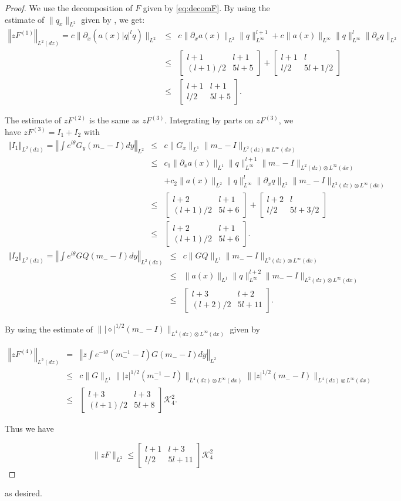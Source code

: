 \documentclass{amsart}
\theoremstyle{plain}
\theoremstyle{remark}
\numberwithin{equation}{section}
\newcommand{\norm}[2]{\left\Vert #1\right\Vert_{#2}}
\newcommand{\Twomat}[4]
{
\left[
	\begin{array}{cc}
		{#1}	&	{#2}	\\[10pt]
		{#3}	&	{#4}
		\end{array}
\right]
}
\begin{document}
\begin{proof}
We use the decomposition of $F$ given by \eqref{eq:decomF}.
By using the estimate of $\|q_x\|_{L^2}$ given by \cite[Lemma 5.24]{DZ-2}, we get:
\begin{eqnarray*}
    \norm{z F^{(1)}}{L^2(dz)} =c \|\partial_x (a(x) |q|^l q)\|_{L^2} &\leq& c \|\partial_x a(x)\|_{L^2} \|q\|_{L^\infty}^{l+1} + c\|a(x)\|_{L^\infty} \|q\|_{L^\infty}^l \|\partial_x q\|_{L^2}\\
    &\leq& \Twomat{l+1}{l+1}{(l+1)/2}{5l+5}+\Twomat{l+1}{l}{l/2}{5l+1/2}\\
    &\leq& \Twomat{l+1}{l+1}{l/2}{5l+5}.
\end{eqnarray*}

The estimate of $zF^{(2)}$ is the same as $zF^{(3)}$. Integrating by parts on $zF^{(3)}$, we have $zF^{(3)}=I_1+I_2$ with
\begin{eqnarray*}
    \norm{I_{1}}{L^2(dz)} = \left \Vert \int e^{i \theta}G_y(m_--I)dy \right \Vert_{L^2} &\leq&c\|G_x\|_{L^1} \|m_--I\|_{L^2(dz) \otimes L^\infty(dx)} \\
    & \leq &c_1\|\partial_x a(x)\|_{L^1} \|q\|_{L^\infty}^{l+1}\|m_--I\|_{L^2(dz) \otimes L^\infty(dx)}\\
    &&+c_2\|a(x)\|_{L^2} \|q\|_{L^\infty}^l \|\partial_x q\|_{L^2}\|m_--I\|_{L^2(dz) \otimes L^\infty(dx)}\\
    &\leq&\Twomat{l+2}{l+1}{(l+1)/2}{5l+6}+\Twomat{l+2}{l}{l/2}{5l+3/2}\\
    &\leq&\Twomat{l+2}{l+1}{(l+1)/2}{5l+6}.
\end{eqnarray*}
\begin{eqnarray*}
   \norm{I_{2}}{L^2(dz)} = \left \Vert \int e^{i \theta}GQ(m_--I)dy \right \Vert_{L^2(dz)} &\leq&c\|GQ\|_{L^1} \|m_--I\|_{L^2(dz) \otimes L^\infty(dx)} \\
    & \leq & \|a(x)\|_{L^1} \|q\|_{L^\infty}^{l+2}\|m_--I\|_{L^2(dz) \otimes L^\infty(dx)}\\
  &  \leq & \Twomat{l+3}{l+2}{(l+2)/2}{5l+11}.
\end{eqnarray*}

By using the estimate of $\||\diamond|^{1/2}(m_--I)\|_{L^4(dz) \otimes L^\infty(dx)}$ given by \cite[Lemma 5.6]{DZ-2}

\begin{eqnarray*}
    \norm{z F^{(4)}}{L^2(dz)} &=&\left \Vert z\int e^{-i\theta}(m_-^{-1}-I)G(m_--I)dy \right \Vert_{L^2}\\
    &\leq&c\|G\|_{L^1} \||z|^{1/2}(m_-^{-1}-I)\|_{L^4(dz) \otimes L^\infty(dx)}\||z|^{1/2}(m_--I)\|_{L^4(dz) \otimes L^\infty(dx)} \\
    & \leq & \Twomat{l+3}{l+3}{(l+1)/2}{5l+8}\mathcal{K}_4^2.
\end{eqnarray*}

Thus we have

\[\|z F\|_{L^2} \leq \Twomat{l+1}{l+3}{l/2}{5l+11}\mathcal{K}_4^2\]
\end{proof} as desired.
\end{document}
